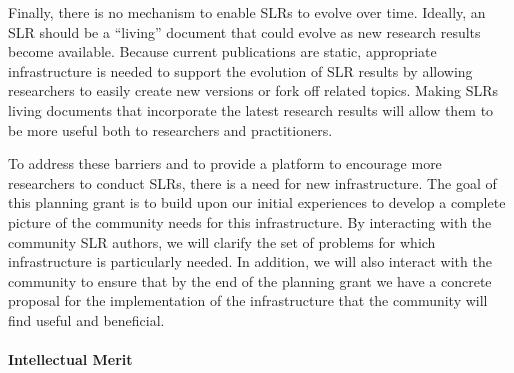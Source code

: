 Finally, there is  no mechanism to enable SLRs to evolve over time. Ideally, an SLR should be a ``living'' document that could evolve as new research results become available. Because current publications are static, appropriate infrastructure is needed to support the evolution of SLR results by allowing researchers to easily create new versions or fork off related topics. Making SLRs living documents that incorporate the latest research results will allow them to be more useful both to researchers and practitioners.

To address these barriers and to provide a platform to encourage more researchers to conduct SLRs, there is a need for new infrastructure. The goal of this planning grant is to build upon our initial experiences to develop a complete picture of the community needs for this infrastructure. By interacting with the community SLR authors, we will clarify the set of problems for which infrastructure is particularly needed. In addition, we will also interact with the community to ensure that by the end of the planning grant we have a concrete proposal for the implementation of the infrastructure that the community will find useful and beneficial.

\paragraph{Intellectual Merit}

